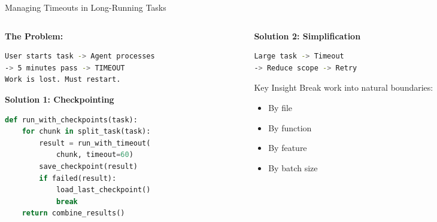 \documentclass[aspectratio=169,11pt]{beamer}
\begin{document}
\begin{frame}[fragile]{Managing Timeouts in Long-Running Tasks}
    \begin{columns}[T]
        \begin{column}{0.52\textwidth}
            \textbf{The Problem:}
            \begin{lstlisting}[language=Bash]
User starts task -> Agent processes
-> 5 minutes pass -> TIMEOUT
Work is lost. Must restart.
            \end{lstlisting}

            \vspace{0.3cm}
            \textbf{Solution 1: Checkpointing}
            \begin{lstlisting}[language=Python]
def run_with_checkpoints(task):
    for chunk in split_task(task):
        result = run_with_timeout(
            chunk, timeout=60)
        save_checkpoint(result)
        if failed(result):
            load_last_checkpoint()
            break
    return combine_results()
            \end{lstlisting}
        \end{column}
        \begin{column}{0.45\textwidth}
            \textbf{Solution 2: Simplification}
            \begin{lstlisting}[language=Bash]
Large task -> Timeout
-> Reduce scope -> Retry
            \end{lstlisting}

            \vspace{0.3cm}
            \begin{block}{Key Insight}
                Break work into natural boundaries:
                \begin{itemize}
                    \item By file
                    \item By function
                    \item By feature
                    \item By batch size
                \end{itemize}
            \end{block}
        \end{column}
    \end{columns}
\end{frame}
\end{document}
